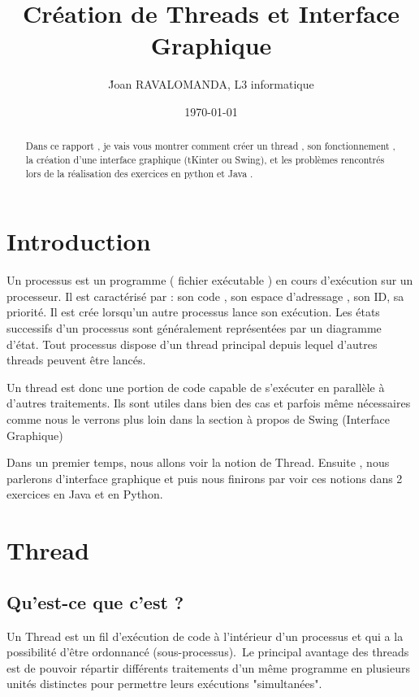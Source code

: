 \documentclass{article}
\title{Création de Threads et Interface Graphique}
\author{\'Joan RAVALOMANDA, L3 informatique}
\date{\today}
\begin{document}
\maketitle %


\begin{abstract}
  Dans ce rapport , je vais vous montrer comment créer un thread , son fonctionnement , la création d'une interface graphique (tKinter ou Swing), et les problèmes rencontrés lors de la réalisation des exercices en python et Java .
\end{abstract}

\section{Introduction}
\label{section:hello} %

Un processus est un programme ( fichier exécutable ) en cours d'exécution sur un processeur.
Il est caractérisé par : son code , son espace d'adressage , son ID, sa priorité.
Il est crée lorsqu'un autre processus lance son exécution. 
Les états successifs d'un processus sont généralement représentées par un diagramme d'état.
Tout processus dispose d’un thread principal depuis lequel d’autres threads peuvent être lancés.


Un thread est donc une portion de code capable de s'exécuter en parallèle à d'autres traitements. Ils sont utiles dans bien des cas et parfois même nécessaires comme nous le verrons plus loin dans la section à propos de Swing (Interface Graphique)


Dans un premier temps, nous allons voir la notion de Thread. Ensuite , nous parlerons d'interface graphique et puis nous finirons par voir ces notions dans 2 exercices en Java et en Python.

\section{Thread}
\subsection{Qu'est-ce que c'est ?}
Un Thread est un fil d'exécution de code à l'intérieur d'un processus et qui a la possibilité d'être ordonnancé (sous-processus). Le principal avantage des threads est de pouvoir répartir différents traitements d'un même programme en plusieurs unités distinctes pour permettre leurs exécutions "simultanées".
\end{document}
